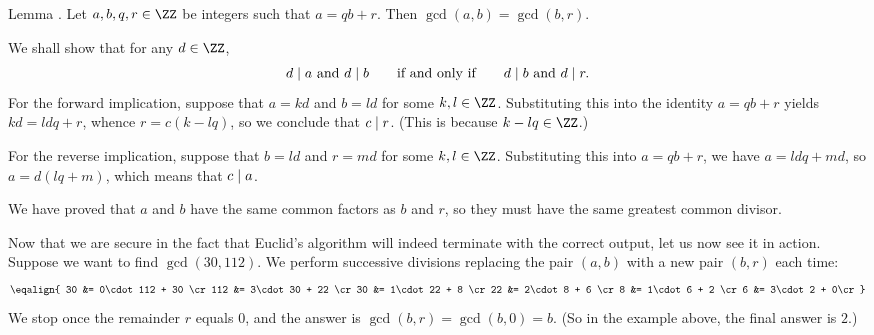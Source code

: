 \proclaim Lemma \advthm. Let $a,b,q,r\in \ZZ$ be integers such that $a = qb+r$. Then
$\gcd(a,b) = \gcd(b,r)$.

\proof We shall show that for any $d\in \ZZ$,
$$ d\divides a\ \hbox{and}\ d\divides b\qquad\hbox{if and only if}\qquad
d\divides b\ \hbox{and}\ d\divides r.$$
For the forward implication, suppose that $a = kd$ and $b=ld$ for some $k,l\in \ZZ$. Substituting
this into the identity $a=qb+r$ yields $kd = ldq+r$, whence $r = c(k-lq)$, so we conclude that $c\mid r$.
(This is because $k-lq\in \ZZ$.)

For the reverse implication, suppose that $b = ld$ and $r = md$ for some $k,l\in \ZZ$. Substituting
this into $a=qb+r$, we have $a = ldq + md$, so $a = d(lq+m)$, which means that $c\mid a$.

We have proved that $a$ and $b$ have the same common factors as $b$ and $r$, so they must have the
same greatest common divisor.\slug

Now that we are secure in the fact that Euclid's algorithm will indeed terminate with the correct output,
let us now see it in action. Suppose we want to find $\gcd(30,112)$. We perform successive divisions
replacing the pair $(a,b)$ with a new pair $(b,r)$ each time:
$$\eqalign{
30 &= 0\cdot 112 + 30 \cr
112 &= 3\cdot 30 + 22 \cr
30 &= 1\cdot 22 + 8 \cr
22 &= 2\cdot 8 + 6 \cr
8 &= 1\cdot 6 + 2 \cr
6 &= 3\cdot 2 + 0\cr
}$$
We stop once the remainder $r$ equals $0$, and the answer is $\gcd(b,r) = \gcd(b,0) = b$. (So in the
example above, the final answer is $2$.)


\bye
